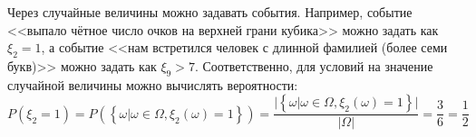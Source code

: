 \documentclass[11pt]{article}
\begin{document}
Через случайные величины можно задавать события. Например, событие <<выпало чётное
число очков на верхней грани кубика>> можно задать как $\xi_2 = 1$, а событие 
<<нам встретился человек с длинной фамилией (более семи букв)>> можно задать как
$\xi_9 > 7$. Соответственно, для условий на значение случайной величины можно
вычислять вероятности:
$$
    P(\xi_2 = 1)
    = P(\left\{\omega \vert \omega \in \Omega, \xi_2(\omega) = 1\right\})
    = \frac
    {\lvert \left\{\omega \vert \omega \in \Omega, \xi_2(\omega) = 1\right\} \rvert}
    {\lvert\Omega\rvert}
    = \frac{3}{6} = \frac{1}{2}
$$
\end{document}
